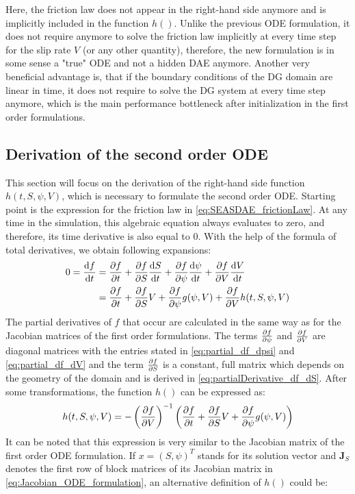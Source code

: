 Here, the friction law does not appear in the right-hand side anymore and is implicitly included in the function $h()$. Unlike the previous ODE formulation, it does not require anymore to solve the friction law implicitly at every time step for the slip rate $V$ (or any other quantity), therefore, the new formulation is in some sense a "true" ODE and not a hidden DAE anymore. Another very beneficial advantage is, that if the boundary conditions of the DG domain are linear in time, it does not require to solve the DG system at every time step anymore, which is the main performance bottleneck after initialization in the first order formulations. 

\subsection{Derivation of the second order ODE}
This section will focus on the derivation of the right-hand side function $h(t,S,\psi,V)$, which is necessary to formulate the second order ODE. Starting point is the expression for the friction law in \autoref{eq:SEASDAE_frictionLaw}. At any time in the simulation, this algebraic equation always evaluates to zero, and therefore, its time derivative is also equal to 0. With the help of the formula of total derivatives, we obtain following expansions: 
\begin{align}
	0 = \dv{f}{t} &= \pdv{f}{t} + \pdv{f}{S}\dv{S}{t} + \pdv{f}{\psi}\dv{\psi}{t} +  \pdv{f}{V}\dv{V}{t} \\
					  &= \pdv{f}{t} + \pdv{f}{S}V + \pdv{f}{\psi}g(\psi,V) + \pdv{f}{V}h(t,S,\psi,V)
\end{align}
The partial derivatives of $f$ that occur are calculated in the same way as for the Jacobian matrices of the first order formulations. The terms $\pdv{f}{\psi}$ and $\pdv{f}{V}$ are diagonal matrices with the entries stated in \autoref{eq:partial_df_dpsi} and \autoref{eq:partial_df_dV} and the term $\pdv{f}{S}$ is a constant, full matrix which depends on the geometry of the domain and is derived in \autoref{eq:partialDerivative_df_dS}. After some transformations, the function $h()$ can be expressed as: 
\begin{equation}
	h(t,S,\psi,V) = -\left(\pdv{f}{V}\right)^{-1}\left(\pdv{f}{t} + \pdv{f}{S}V + \pdv{f}{\psi}g(\psi,V)\right)
\end{equation}
It can be noted that this expression is very similar to the Jacobian matrix of the first order ODE formulation. If $x=(S,\psi)^T$ stands for its solution vector and $\mathbf{J}_{S}$ denotes the first row of block matrices of its Jacobian matrix in \autoref{eq:Jacobian_ODE_formulation}, an alternative definition of $h()$ could be: 
